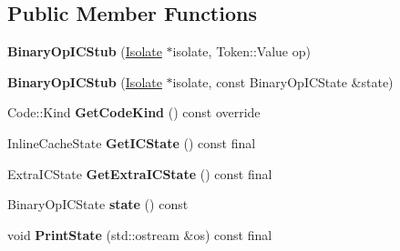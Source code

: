 \subsection*{Public Member Functions}
\begin{DoxyCompactItemize}
\item 
{\bfseries Binary\+Op\+I\+C\+Stub} (\hyperlink{classv8_1_1internal_1_1_isolate}{Isolate} $\ast$isolate, Token\+::\+Value op)\hypertarget{classv8_1_1internal_1_1_binary_op_i_c_stub_a69248f50ae6da2b617c76a185462ef72}{}\label{classv8_1_1internal_1_1_binary_op_i_c_stub_a69248f50ae6da2b617c76a185462ef72}

\item 
{\bfseries Binary\+Op\+I\+C\+Stub} (\hyperlink{classv8_1_1internal_1_1_isolate}{Isolate} $\ast$isolate, const Binary\+Op\+I\+C\+State \&state)\hypertarget{classv8_1_1internal_1_1_binary_op_i_c_stub_a0b0dd6a7d8fefdb93fd73584295c71e6}{}\label{classv8_1_1internal_1_1_binary_op_i_c_stub_a0b0dd6a7d8fefdb93fd73584295c71e6}

\item 
Code\+::\+Kind {\bfseries Get\+Code\+Kind} () const  override\hypertarget{classv8_1_1internal_1_1_binary_op_i_c_stub_a017b1b7950bcaa92b5f19789161f75cb}{}\label{classv8_1_1internal_1_1_binary_op_i_c_stub_a017b1b7950bcaa92b5f19789161f75cb}

\item 
Inline\+Cache\+State {\bfseries Get\+I\+C\+State} () const  final\hypertarget{classv8_1_1internal_1_1_binary_op_i_c_stub_a24e9d6df5c99b55a00bd1b29d9a2475d}{}\label{classv8_1_1internal_1_1_binary_op_i_c_stub_a24e9d6df5c99b55a00bd1b29d9a2475d}

\item 
Extra\+I\+C\+State {\bfseries Get\+Extra\+I\+C\+State} () const  final\hypertarget{classv8_1_1internal_1_1_binary_op_i_c_stub_ab443c3a0692903e43740f3ee4bb62802}{}\label{classv8_1_1internal_1_1_binary_op_i_c_stub_ab443c3a0692903e43740f3ee4bb62802}

\item 
Binary\+Op\+I\+C\+State {\bfseries state} () const \hypertarget{classv8_1_1internal_1_1_binary_op_i_c_stub_acae87a6641661cd227c28a9a4c469cf5}{}\label{classv8_1_1internal_1_1_binary_op_i_c_stub_acae87a6641661cd227c28a9a4c469cf5}

\item 
void {\bfseries Print\+State} (std\+::ostream \&os) const  final\hypertarget{classv8_1_1internal_1_1_binary_op_i_c_stub_ac831ab54b6787ea4bcdef35a764d5f05}{}\label{classv8_1_1internal_1_1_binary_op_i_c_stub_ac831ab54b6787ea4bcdef35a764d5f05}

\end{DoxyCompactItemize}
